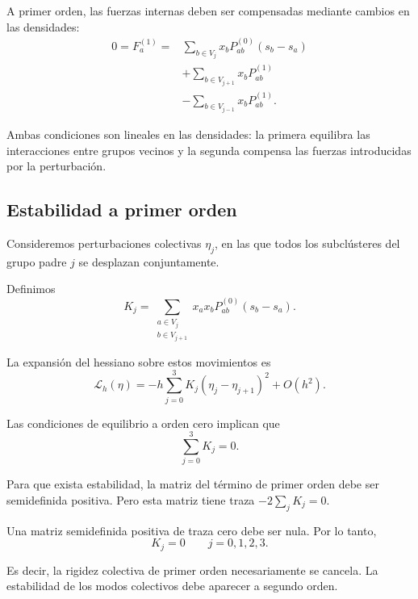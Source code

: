 A primer orden, las fuerzas internas deben ser
compensadas mediante cambios en las densidades:
\begin{equation}
\begin{aligned}
0=F_a^{(1)}
={}&\sum_{b\in V_j}
x_bP_{ab}^{(0)}(s_b-s_a)\\
&+\sum_{b\in V_{j+1}}x_bP_{ab}^{(1)}\\
&-\sum_{b\in V_{j-1}}x_bP_{ab}^{(1)}.
\end{aligned}
\label{eq:equilibrio_uno}
\end{equation}

Ambas condiciones son lineales en las densidades: la primera equilibra las interacciones entre grupos vecinos y la segunda compensa las fuerzas introducidas por la perturbación.

\subsection{Estabilidad a primer orden}

Consideremos perturbaciones colectivas $\eta_j$,
en las que todos los subclústeres del grupo
padre $j$ se desplazan conjuntamente.

Definimos
\begin{equation}
    K_j=
    \sum_{\substack{a\in V_j\\b\in V_{j+1}}}
    x_ax_bP_{ab}^{(0)}(s_b-s_a).
\end{equation}

La expansión del hessiano sobre estos movimientos es
\begin{equation}
    \mathcal{L}_h(\eta)
    =
    -h\sum_{j=0}^{3}
    K_j(\eta_j-\eta_{j+1})^2+O(h^2).
\end{equation}

Las condiciones de equilibrio a orden cero
implican que
\begin{equation}
    \sum_{j=0}^{3}K_j=0.
\end{equation}

Para que exista estabilidad, la matriz del término
de primer orden debe ser semidefinida positiva.
Pero esta matriz tiene traza
$-2\sum_j K_j=0$.

Una matriz semidefinida positiva de traza cero
debe ser nula. Por lo tanto,
\begin{equation}
    K_j=0 \qquad j=0,1,2,3.
    \label{eq:cancelacion_K}
\end{equation}

Es decir, la rigidez colectiva de primer orden
necesariamente se cancela. La estabilidad de los
modos colectivos debe aparecer a segundo orden.

